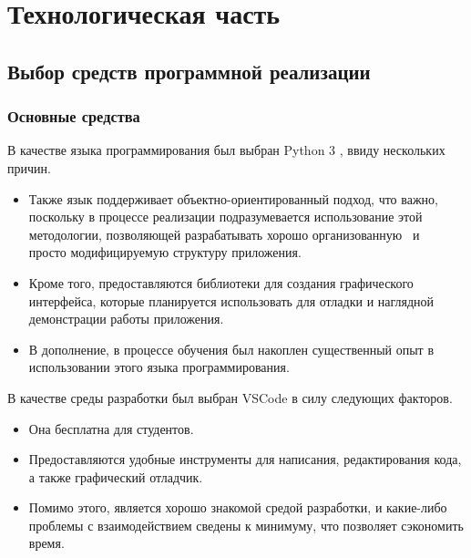 \section{Технологическая часть}
\subsection{Выбор средств программной реализации}
\subsubsection{Основные средства}
В качестве языка программирования был выбран Python 3 \cite{python}, ввиду нескольких причин.
\begin{itemize}
	\item Также язык поддерживает объектно-ориентированный подход, что важно, поскольку в процессе реализации подразумевается использование этой методологии, позволяющей разрабатывать хорошо организованную \, и \, просто модифицируемую структуру приложения.
	\item Кроме того, предоставляются библиотеки для создания графического интерфейса, которые планируется использовать для отладки и наглядной демонстрации работы приложения.
	\item В дополнение, в процессе обучения был накоплен существенный опыт в использовании этого языка программирования. \newline
\end{itemize}
%
В качестве среды разработки был выбран VSCode \cite{vscode} в силу следующих факторов.
\begin{itemize}
	\item Она бесплатна для студентов.
	\item Предоставляются удобные инструменты для написания, редактирования кода, а также графический отладчик.
	\item Помимо этого, является хорошо знакомой средой разработки, и какие-либо проблемы с взаимодействием сведены к минимуму, что позволяет сэкономить время.
\end{itemize}

